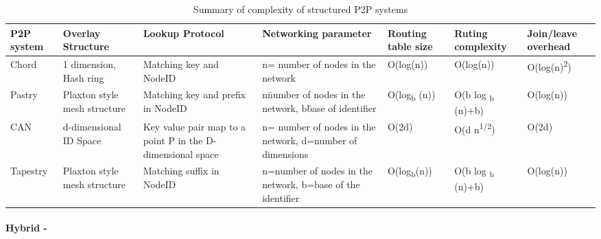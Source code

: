 \documentclass{./llncs2e/llncs}
\begin{document}



\begin{table}
  \begin{tabular}{| p{1.3cm} | p{1.9cm} | p{2cm} | p{2.5cm} | p{1.6cm} | p{1.8cm} | p{1.8cm} |}
    \hline                        
    \textbf{P2P system} & \textbf{Overlay Structure} & \textbf{Lookup Protocol} & \textbf{Networking parameter} & \textbf{Routing table size} & \textbf{Ruting complexity} & \textbf{Join/leave overhead} \\
    
    \hline
    Chord & 1 dimension, Hash ring & Matching key and NodeID & n= number of nodes in the network & O(log(n)) & O(log(n)) & O(log(n)\textsuperscript{2}) \\
    
    \hline
    Pastry & Plaxton style mesh structure & Matching key and prefix in NodeID & n\= number of nodes in the network, b\=base of identifier & O(log\textsubscript{b} (n)) & O(b log \textsubscript{b} (n)+b) & O(log(n)) \\
    
    \hline
    CAN & d-dimensional ID Space & Key value pair map to a point P in the D-dimensional space & n= number of nodes in the network, d=number of dimensions & O(2d) & O(d n\textsuperscript{1/2}) & O(2d) \\
    
    \hline
    Tapestry & Plaxton style mesh structure & Matching suffix in NodeID & n=number of nodes in the network, b=base of the identifier & O(log\textsubscript{b}(n)) & O(b log \textsubscript{b} (n)+b) & O(log(n)) \\
    \hline  
    
  \end{tabular}
  \caption{Summary of complexity of structured P2P systems}
  \label{tbl:Complexity of structured P2P systems}
\end{table}




\paragraph{\textbf{Hybrid -}} %
\label{par:Hybrid}
\end{document}
